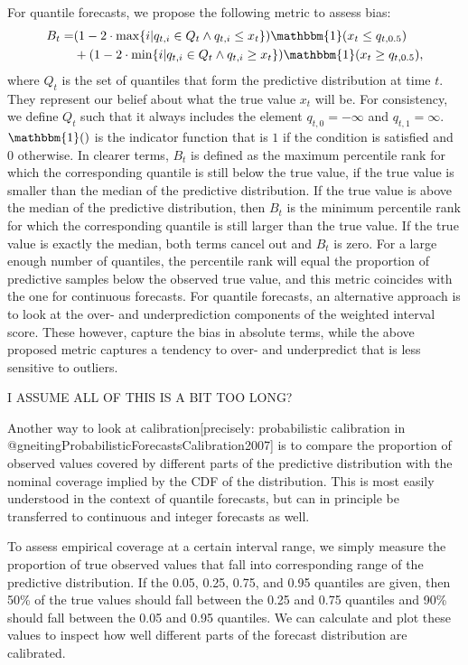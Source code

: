 \documentclass[article]{jss}
\begin{document}
For quantile forecasts, we propose the following metric to assess bias: 
\begin{align*}
  B_t =& (1 - 2 \cdot \max \{i | q_{t,i} \in Q_t \land q_{t,i} \leq x_t \}) \mathbbm{1}( x_t \leq q_{t, 0.5}) \\
  &+ (1 - 2 \cdot \min \{i | q_{t,i} \in Q_t \land q_{t,i} \geq x_t\}) \mathbbm{1}( x_t \geq q_{t, 0.5}),
\end{align*}
where $Q_t$ is the set of quantiles that form the predictive distribution at time $t$. They represent our belief about what the true value $x_t$ will be. For consistency, we define $Q_t$ such that it always includes the element $q_{t, 0} = - \infty$ and $q_{t,1} = \infty$. $\mathbbm{1}()$ is the indicator function that is $1$ if the condition is satisfied and $0$ otherwise. In clearer terms, $B_t$ is defined as the maximum percentile rank for which the corresponding quantile is still below the true value, if the true value is smaller than the median of the predictive distribution. If the true value is above the median of the predictive distribution, then $B_t$ is the minimum percentile rank for which the corresponding quantile is still larger than the true value. If the true value is exactly the median, both terms cancel out and $B_t$ is zero. For a large enough number of quantiles, the percentile rank will equal the proportion of predictive samples below the observed true value, and this metric coincides with the one for continuous forecasts. For quantile forecasts, an alternative approach is to look at the over- and underprediction components of the weighted interval score. These however, capture the bias in absolute terms, while the above proposed metric captures a tendency to over- and underpredict that is less sensitive to outliers. 

I ASSUME ALL OF THIS IS A BIT TOO LONG? 

Another way to look at calibration[precisely: probabilistic calibration in @gneitingProbabilisticForecastsCalibration2007] is to compare the proportion of observed values covered by different parts of the predictive distribution with the nominal coverage implied by the CDF of the distribution. This is most easily understood in the context of quantile forecasts, but can in principle be transferred to continuous and integer forecasts as well. 

To assess empirical coverage at a certain interval range, we simply measure the proportion of true observed values that fall into corresponding range of the predictive distribution. If the 0.05, 0.25, 0.75, and 0.95 quantiles are given, then 50\% of the true values should fall between the 0.25 and 0.75 quantiles and 90\% should fall between the 0.05 and 0.95 quantiles. We can calculate and plot these values to inspect how well different parts of the forecast distribution are calibrated. 
\end{document}

